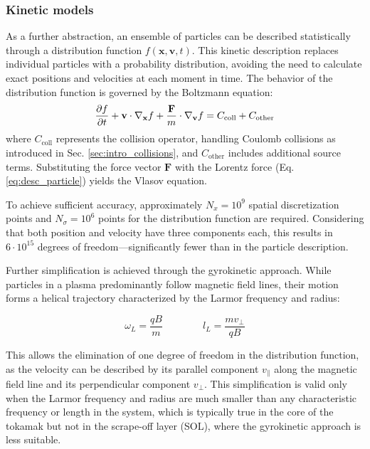 \subsubsection{Kinetic models}
\label{ssec:desc_kineticModels}
As a further abstraction, an ensemble of particles can be described statistically through a distribution function $f(\mathbf{x}, \mathbf{v},t)$. This kinetic description replaces individual particles with a probability distribution, avoiding the need to calculate exact positions and velocities at each moment in time. The behavior of the distribution function is governed by the Boltzmann equation:
\begin{equation}
	\label{eq:BoltzmannEquationKineticDescription}
	\pdv{f}{t} + \mathbf{v} \cdot \nabla_{\mathbf{x}} f + \frac{\mathbf{F}}{m} \cdot \nabla_{\mathbf{v}} f = C_{\text{coll}} + C_{\text{other}}
\end{equation}
where $C_{\text{coll}}$ represents the collision operator, handling Coulomb collisions as introduced in Sec. \ref{sec:intro_collisions}, and $C_{\text{other}}$ includes additional source terms. Substituting the force vector $\mathbf{F}$ with the Lorentz force (Eq. \ref{eq:desc_particle}) yields the Vlasov equation. \newline

To achieve sufficient accuracy, approximately $N_x = 10^9$ spatial discretization points and $N_\sigma = 10^6$ points for the distribution function are required. Considering that both position and velocity have three components each, this results in $6 \cdot 10^{15}$ degrees of freedom—significantly fewer than in the particle description. \newline

Further simplification is achieved through the gyrokinetic approach. While particles in a plasma predominantly follow magnetic field lines, their motion forms a helical trajectory characterized by the Larmor frequency and radius:

\begin{equation}
	\omega_L = \frac{qB}{m} \qquad\qquad l_L = \frac{mv_\perp}{qB}
\end{equation}

This allows the elimination of one degree of freedom in the distribution function, as the velocity can be described by its parallel component $v_\parallel$ along the magnetic field line and its perpendicular component $v_\perp$. This simplification is valid only when the Larmor frequency and radius are much smaller than any characteristic frequency or length in the system, which is typically true in the core of the tokamak but not in the scrape-off layer (SOL), where the gyrokinetic approach is less suitable. \\

